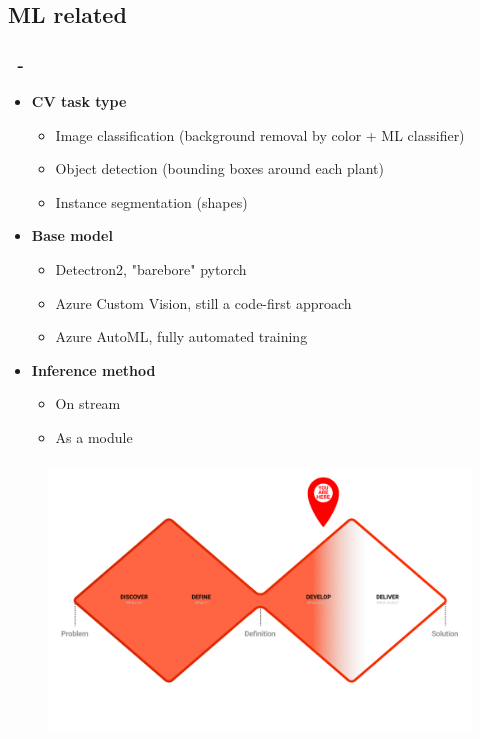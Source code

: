\documentclass{beamer}
\begin{document}
\subsection{ML related}
\begin{frame}
\frametitle{\secname\ - \subsecname}
\begin{itemize}
\item \textbf{CV task type}
\begin{itemize}
    \item Image classification (background removal by color + ML classifier)
    \item Object detection (bounding boxes around each plant)
    \item Instance segmentation (shapes)
\end{itemize}
\item \textbf{Base model}
\begin{itemize}
    \item Detectron2, "barebore" pytorch
    \item Azure Custom Vision, still a code-first approach
    \item Azure AutoML, fully automated training
\end{itemize}
\item \textbf{Inference method}
\begin{itemize}
    \item On stream
    \item As a module
\end{itemize}
\end{itemize}
\end{frame}


\begin{frame}
\frametitle{\secname}
\begin{figure}
\includegraphics[width=0.9\linewidth]{Imagens/V1 C.jpg}
\end{figure}
\end{frame}
\end{document}
